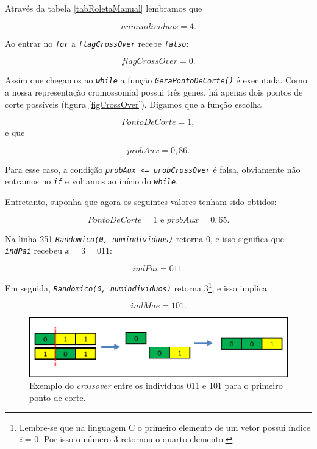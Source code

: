 	Através da tabela \ref{tabRoletaManual} lembramos que 
	
	$$
		numindividuos = 4.
	$$
	
	Ao entrar no \textit{\texttt{for}} a \textit{\texttt{flagCrossOver}} recebe \textit{\texttt{falso}}:
	
	$$
		flagCrossOver = 0.
	$$

	Assim que chegamos ao \textit{\texttt{while}} a função \textit{\texttt{GeraPontoDeCorte()}} é executada. Como a nossa representação cromossomial possui três genes, há apenas dois pontos de corte possíveis (figura \ref{figCrossOver}). Digamos que a função escolha
	
	$$
		PontoDeCorte = 1,
	$$
	e que
	
	$$
		probAux = 0,86.
	$$
	
	Para esse caso, a condição \textit{\texttt{probAux <= probCrossOver}} é falsa, obviamente não entramos no \textit{\texttt{if}} e voltamos ao início do \textit{\texttt{while}}.
	
	Entretanto, suponha que agora os seguintes valores tenham sido obtidos:
	
	$$
		PontoDeCorte = 1 \mbox{  e  } probAux = 0,65.
	$$
	
	Na linha 251 \textit{\texttt{Randomico(0, numindividuos)}} retorna 0, e isso significa que \textit{\texttt{indPai}} recebeu $x = 3 = 011$:
	
	$$
		indPai = 011.
	$$
	
	Em seguida, \textit{\texttt{Randomico(0, numindividuos)}} retorna 3\footnote{Lembre-se que na linguagem C o primeiro elemento de um vetor possui índice \textit{i} = 0. Por isso o número 3 retornou o quarto elemento.}, e isso implica
	
	$$
		indMae = 101.
	$$
	
	\begin{figure}[htp]
		\begin{center}
			\includegraphics[width=13cm]{figs/ga/exemplo_crossover.png}
		\end{center}
		\caption{\label{figExemploCrossOver} Exemplo do \textit{crossover} entre os indivíduos 011 e 101 para o primeiro ponto de corte.}
	\end{figure}
	

